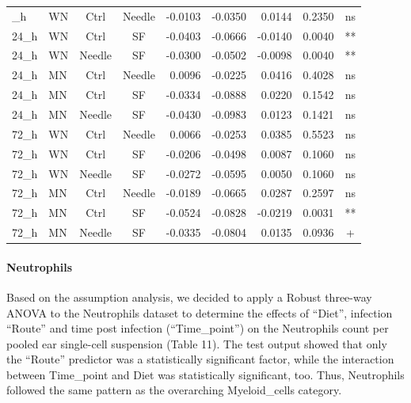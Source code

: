 \documentclass[
  12pt,
  letterpaper,
]{article}
\begin{document}
\begin{longtable}{llccrrrrc}
\midrule\addlinespace[2.5pt]
\multicolumn{9}{l}{Predictor: Route} \\ 
\midrule\addlinespace[2.5pt]
24\_h & WN & Ctrl & Needle & -0.0103 & -0.0350 & 0.0144 & 0.2350 & ns \\ 
24\_h & WN & Ctrl & SF & -0.0403 & -0.0666 & -0.0140 & 0.0040 & ** \\ 
24\_h & WN & Needle & SF & -0.0300 & -0.0502 & -0.0098 & 0.0040 & ** \\ 
24\_h & MN & Ctrl & Needle & 0.0096 & -0.0225 & 0.0416 & 0.4028 & ns \\ 
24\_h & MN & Ctrl & SF & -0.0334 & -0.0888 & 0.0220 & 0.1542 & ns \\ 
24\_h & MN & Needle & SF & -0.0430 & -0.0983 & 0.0123 & 0.1421 & ns \\ 
72\_h & WN & Ctrl & Needle & 0.0066 & -0.0253 & 0.0385 & 0.5523 & ns \\ 
72\_h & WN & Ctrl & SF & -0.0206 & -0.0498 & 0.0087 & 0.1060 & ns \\ 
72\_h & WN & Needle & SF & -0.0272 & -0.0595 & 0.0050 & 0.1060 & ns \\ 
72\_h & MN & Ctrl & Needle & -0.0189 & -0.0665 & 0.0287 & 0.2597 & ns \\ 
72\_h & MN & Ctrl & SF & -0.0524 & -0.0828 & -0.0219 & 0.0031 & ** \\ 
72\_h & MN & Needle & SF & -0.0335 & -0.0804 & 0.0135 & 0.0936 & + \\ 
\bottomrule
\end{longtable}

\paragraph{Neutrophils}\label{neutrophils-1}

Based on the assumption analysis, we decided to apply a Robust three-way ANOVA to the Neutrophils dataset to determine the effects of ``Diet'', infection ``Route'' and time post infection (``Time\_point'') on the Neutrophils count per pooled ear single-cell suspension (Table 11). The test output showed that only the ``Route'' predictor was a statistically significant factor, while the interaction between Time\_point and Diet was statistically significant, too. Thus, Neutrophils followed the same pattern as the overarching Myeloid\_cells category.
\end{document}
